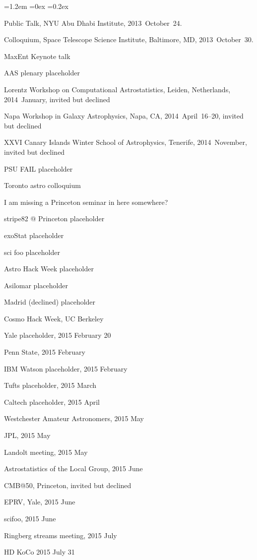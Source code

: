 \documentclass[10pt,letterpaper]{article}
\newcommand{\acronym}[1]{{\small{#1}}}
\newcounter{refpubnum}
\newcommand{\hogglist}{%
    \rightmargin=0in
    \leftmargin=1.2em
    \topsep=0ex
    \partopsep=0pt
    \itemsep=0.2ex
    \parsep=0pt
    \itemindent=-1.0\leftmargin
    \listparindent=0.0\leftmargin
    \settowidth{\labelsep}{~}
    \usecounter{refpubnum}
  }
\begin{document}
\begin{list}{}{\hogglist}
{\item Public Talk, NYU Abu Dhabi Institute, 2013~October~24.
\item Colloquium, Space Telescope Science Institute, Baltimore, MD, 2013~October~30.
\item MaxEnt Keynote talk
\item \acronym{AAS} plenary placeholder
\item Lorentz Workshop on Computational Astrostatistics, Leiden, Netherlands, 2014~January, invited but declined
\item Napa Workshop in Galaxy Astrophysics, Napa, CA, 2014~April~16--20, invited but declined
\item XXVI Canary Islands Winter School of Astrophysics, Tenerife, 2014~November, invited but declined
\item PSU FAIL placeholder
\item Toronto astro colloquium
\item [I am missing a Princeton seminar in here somewhere?]
\item stripe82 @ Princeton placeholder
\item exoStat placeholder
\item sci foo placeholder
\item Astro Hack Week placeholder
\item Asilomar placeholder
\item Madrid (declined) placeholder
\item Cosmo Hack Week, UC Berkeley
\item Yale placeholder, 2015 February 20
\item Penn State, 2015 February
\item IBM Watson placeholder, 2015 February
\item Tufts placeholder, 2015 March
\item Caltech placeholder, 2015 April
\item Westchester Amateur Astronomers, 2015 May
\item JPL, 2015 May
\item Landolt meeting, 2015 May
\item Astrostatistics of the Local Group, 2015 June
\item CMB@50, Princeton, invited but declined
\item EPRV, Yale, 2015 June
\item scifoo, 2015 June
\item Ringberg streams meeting, 2015 July
\item HD KoCo 2015 July 31
}
\end{list}
\end{document}
